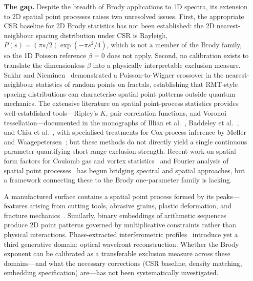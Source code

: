 \documentclass[final,1p,times]{elsarticle}
\theoremstyle{definition}
\begin{document}
\textbf{The gap.} Despite the breadth of Brody applications to 1D
spectra, its extension to 2D spatial point processes raises two
unresolved issues. First, the appropriate CSR baseline for 2D Brody
statistics has not been established: the 2D nearest-neighbour spacing
distribution under CSR is Rayleigh, $P(s)=(\pi s/2)\exp(-\pi s^2/4)$,
which is not a member of the Brody family, so the 1D Poisson reference
$\beta=0$ does not apply. Second, no calibration exists to translate
the dimensionless $\beta$ into a physically interpretable exclusion
measure. Sakhr and Nieminen~\cite{SAKHR-NIEMINEN-2005} demonstrated
a Poisson-to-Wigner crossover in the nearest-neighbour statistics of
random points on fractals, establishing that RMT-style spacing
distributions can characterise spatial point patterns outside quantum
mechanics. The extensive literature on spatial point-process
statistics provides well-established tools---Ripley's $K$, pair
correlation functions, and Voronoi tessellation---documented in the
monographs of Illian et al.~\cite{ILLIAN-2008}, Baddeley
et al.~\cite{BADDELEY-2015}, and Chiu et al.~\cite{CHIU-2013},
with specialised treatments for Cox-process inference by
M{\o}ller and Waagepetersen~\cite{MOLLER-WAAGEPETERSEN-2002};
but these methods do not directly yield a
single continuous parameter quantifying short-range exclusion
strength. Recent work on spatial form factors for Coulomb gas and
vortex statistics~\cite{MASSARO-DELCAMPO-2025} and Fourier analysis
of spatial point processes~\cite{YANG-GUAN-2026} has begun bridging
spectral and spatial approaches, but a framework connecting these to
the Brody one-parameter family is lacking. 

A manufactured surface
contains a spatial point process formed by its peaks---features
arising from cutting tools, abrasive grains, plastic deformation,
and fracture mechanics~\cite{HELMLI-2011-FV}. Similarly, binary
embeddings of arithmetic sequences produce 2D point patterns governed
by multiplicative constraints rather than physical interactions.
Phase-extracted interferometric profiles~\cite{KUCHARSKI-2025-MEASUREMENT}
introduce yet a third generative domain: optical wavefront
reconstruction. Whether the Brody exponent can be calibrated as a
transferable exclusion measure across these domains---and what the
necessary corrections (CSR baseline, density matching, embedding
specification) are---has not been systematically investigated.
\end{document}

